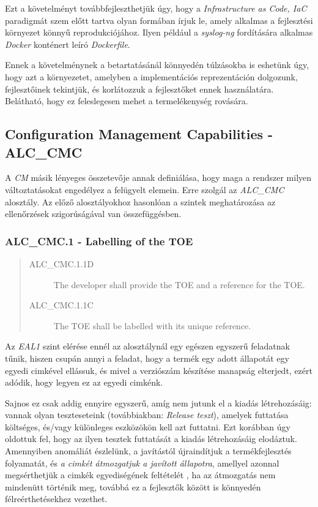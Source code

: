 Ezt a követelményt továbbfejleszthetjük úgy, hogy a \emph{Infrastructure as Code, IaC} paradigmát
szem előtt tartva olyan formában írjuk le, amely alkalmas a fejlesztési környezet könnyű
reprodukciójához. Ilyen például a \emph{syslog-ng} fordítására alkalmas \emph{Docker} konténert
leíró \emph{Dockerfile}. \cite{syslogngenv}

Ennek a követelménynek a betartatásánál könnyedén túlzásokba is eshetünk úgy, hogy azt
a környezetet, amelyben a implementációs reprezentáción dolgozunk, fejlesztőinek tekintjük, és
korlátozzuk a fejlesztőket ennek használatára. Belátható, hogy ez feleslegesen mehet
a termelékenység rovására.

\pagebreak[3]
\subsection{Configuration Management Capabilities - ALC\_CMC}

A \emph{CM} másik lényeges összetevője annak definiálása, hogy maga a rendszer milyen
változtatásokat engedélyez a felügyelt elemein. Erre szolgál az \emph{ALC\_CMC} alosztály.
Az előző alosztályokhoz hasonlóan a szintek meghatározása az ellenőrzések szigorúságával van
összefüggésben.

\subsubsection{ALC\_CMC.1 - Labelling of the TOE}
\begin{quote}
    \begin{description}
        \item[ALC\_CMC.1.1D]{The developer shall provide the TOE and a reference for the TOE.}
        \item[ALC\_CMC.1.1C]{The TOE shall be labelled with its unique reference.}
    \end{description}
\end{quote}

Az \emph{EAL1} szint elérése ennél az alosztálynál egy egészen egyszerű feladatnak tűnik, hiszen
csupán annyi a feladat, hogy a termék egy adott állapotát egy egyedi cimkével ellássuk, és mivel
a verziószám készítése manapság elterjedt, ezért adódik, hogy legyen ez az egyedi cimkénk.

Sajnos ez csak addig ennyire egyszerű, amíg nem jutunk el a kiadás létrehozásáig: vannak olyan
teszteseteink (továbbiakban: \emph{Release teszt}), amelyek futtatása költséges, és/vagy különleges
eszközökön kell azt futtatni. Ezt korábban úgy oldottuk fel, hogy az ilyen tesztek futtatását
a kiadás létrehozásáig elodáztuk.  Amennyiben anomáliát észlelünk, a javítástól újraindítjuk
a termékfejlesztés folyamatát, és \emph{a cimkét átmozgatjuk a javított állapotra}, amellyel azonnal
megsérthetjük a cimkék egyediségének feltételét , ha az átmozgatás nem mindenütt történik meg,
továbbá ez a fejlesztők között is könnyedén félreérthetésekhez vezethet.


